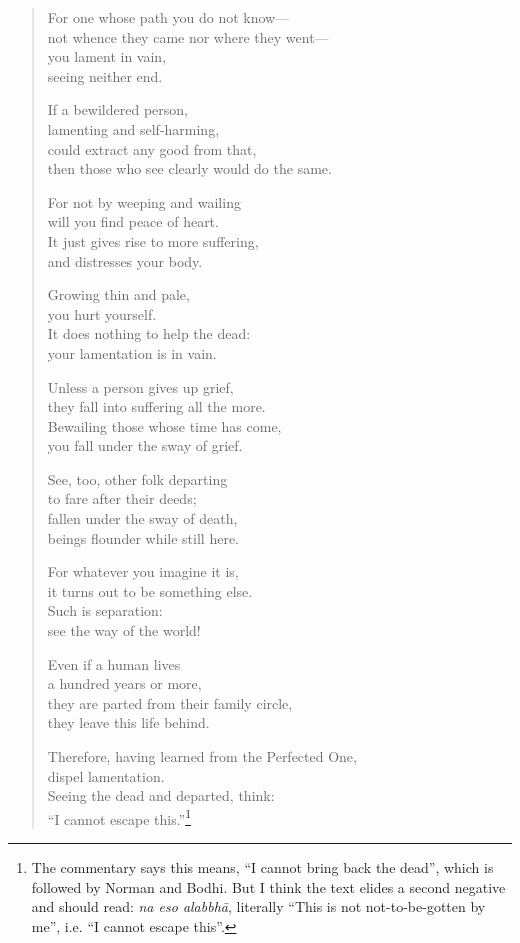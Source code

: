 \documentclass[12pt,openany]{book}%
\begin{document}
\begin{verse}
For one whose path you do not know—\\
not whence they came nor where they went—\\
you lament in vain, \\
seeing neither end. 

If a bewildered person, \\
lamenting and self-harming, \\
could extract any good from that, \\
then those who see clearly would do the same. 

For not by weeping and wailing \\
will you find peace of heart. \\
It just gives rise to more suffering, \\
and distresses your body. 

Growing thin and pale, \\
you hurt yourself. \\
It does nothing to help the dead: \\
your lamentation is in vain. 

Unless a person gives up grief, \\
they fall into suffering all the more. \\
Bewailing those whose time has come, \\
you fall under the sway of grief. 

See, too, other folk departing \\
to fare after their deeds; \\
fallen under the sway of death, \\
beings flounder while still here. 

For whatever you imagine it is, \\
it turns out to be something else. \\
Such is separation: \\
see the way of the world! 

Even if a human lives \\
a hundred years or more, \\
they are parted from their family circle, \\
they leave this life behind. 

Therefore, having learned from the Perfected One, \\
dispel lamentation. \\
Seeing the dead and departed, think: \\
“I cannot escape this.”\footnote{The commentary says this means, “I cannot bring back the dead”, which is followed by Norman and Bodhi. But I think the text elides a second negative and should read: \textit{na eso \textsanskrit{alabbhā}}, literally “This is not not-to-be-gotten by me”, i.e. “I cannot escape this”. } 


\end{verse}
\end{document}
